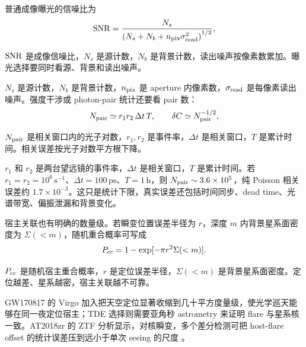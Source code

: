 普通成像曝光的信噪比为
\begin{equation}
  {\rm SNR}=
  \frac{N_s}
  {\left(N_s+N_b+n_{\rm pix}\sigma_{\rm read}^2\right)^{1/2}},
  \label{eq:ch13-imaging-snr}
\end{equation}
\begin{formulaexplain}
\({\rm SNR}\) 是成像信噪比，\(N_s\) 是源计数，\(N_b\) 是背景计数，读出噪声按像素数累加。曝光选择要同时看源、背景和读出噪声。
\end{formulaexplain}
\(N_s\) 是源计数，\(N_b\) 是背景计数，\(n_{\rm pix}\) 是 aperture 内像素数，\(\sigma_{\rm read}\) 是每像素读出噪声。强度干涉或 photon-pair 统计还要看 pair 数：
\begin{equation}
  N_{\rm pair}\simeq r_1 r_2\,\Delta t\,T,
  \qquad
  \delta C\simeq N_{\rm pair}^{-1/2},
  \label{eq:ch13-pair-statistics}
\end{equation}
\begin{formulaexplain}
\(N_{\rm pair}\) 是相关窗口内的光子对数，\(r_1,r_2\) 是事件率，\(\Delta t\) 是相关窗口，\(T\) 是累计时间。相关误差按光子对数平方根下降。
\end{formulaexplain}
\(r_1\) 和 \(r_2\) 是两台望远镜的事件率，\(\Delta t\) 是相关窗口，\(T\) 是累计时间。若 \(r_1=r_2=10^6\,\mathrm{s^{-1}}\)、\(\Delta t=100\,\mathrm{ps}\)、\(T=1\,\mathrm{h}\)，则 \(N_{\rm pair}\sim3.6\times10^5\)，纯 Poisson 相关误差约 \(1.7\times10^{-3}\)。这只是统计下限，真实误差还包括时间同步、dead time、光谱带宽、偏振泄漏和背景变化。

宿主关联也有明确的数量级。若瞬变位置误差半径为 \(r\)，深度 \(m\) 内背景星系面密度为 \(\Sigma(<m)\)，随机重合概率可写成
\begin{equation}
  P_{\rm cc}=1-\exp[-\pi r^2\Sigma(<m)].
  \label{eq:ch13-chance-coincidence}
\end{equation}
\begin{formulaexplain}
\(P_{\rm cc}\) 是随机宿主重合概率，\(r\) 是定位误差半径，\(\Sigma(<m)\) 是背景星系面密度。定位越差、星系越密，宿主关联越不可靠。
\end{formulaexplain}
GW170817 的 Virgo 加入把天空定位显著收缩到几十平方度量级，使光学巡天能够在同一夜定位宿主；TDE 选择则需要亚角秒 astrometry 来证明 flare 与星系核一致。AT2018zr 的 ZTF 分析显示，对核瞬变，多个差分检测可把 host-flare offset 的统计误差压到远小于单次 seeing 的尺度 \citep{2017PhRvL.119p1101A,2017ApJ...848L..12A,2019ApJ...872..198V}。

